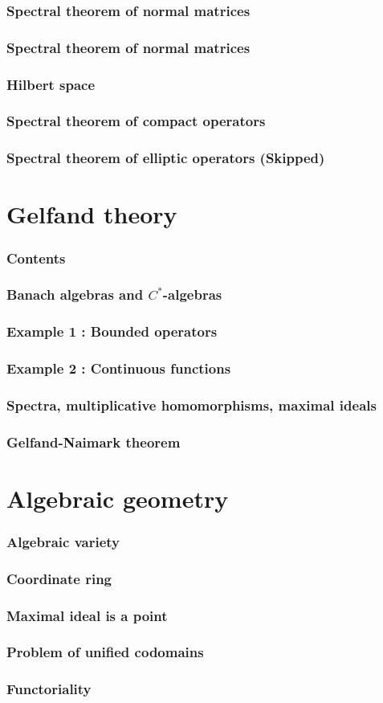 \documentclass{beamer}
\begin{document}
\begin{frame}
\frametitle{Spectral theorem of normal matrices}
\end{frame}

\begin{frame}
\frametitle{Spectral theorem of normal matrices}
\end{frame}

\begin{frame}
\frametitle{Hilbert space}
\end{frame}

\begin{frame}
\frametitle{Spectral theorem of compact operators}
\end{frame}

\begin{frame}
\frametitle{Spectral theorem of elliptic operators (Skipped)}
\end{frame}


\section{Gelfand theory}
\begin{frame}
\frametitle{Contents}
  \tableofcontents[currentsection]
\end{frame}

\begin{frame}
\frametitle{Banach algebras and $C^*$-algebras}
\end{frame}
\begin{frame}
\frametitle{Example 1 : Bounded operators}
\end{frame}
\begin{frame}
\frametitle{Example 2 : Continuous functions}
\end{frame}
\begin{frame}
\frametitle{Spectra, multiplicative homomorphisms, maximal ideals}
\end{frame}
\begin{frame}
\frametitle{Gelfand-Naimark theorem}
\end{frame}


\section{Algebraic geometry}
\begin{frame}
\frametitle{Algebraic variety}
\end{frame}
\begin{frame}
\frametitle{Coordinate ring}
\end{frame}
\begin{frame}
\frametitle{Maximal ideal is a point}
\end{frame}
\begin{frame}
\frametitle{Problem of unified codomains}
\end{frame}
\begin{frame}
\frametitle{Functoriality}
\end{frame}
\end{document}
